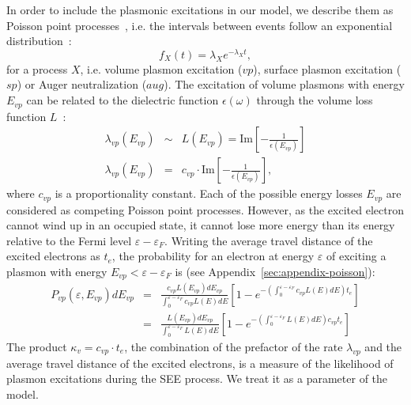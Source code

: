 \begin{refsection}
In order to include the plasmonic excitations in our model, we describe 
them as Poisson point processes~\cite{Egerton2009}, i.e. the intervals between events follow an 
exponential distribution~\cite{MITopencourseware}: 
\begin{equation} 
f_X (t) = \lambda_X e^{-\lambda_X t}, 
\end{equation} 
for a process $X$, i.e. volume plasmon excitation ($vp$), surface plasmon 
excitation ($sp$) or Auger neutralization ($aug$). The 
excitation of volume plasmons with energy $E_{vp}$ can be related to the 
dielectric function $\epsilon (\omega)$ through the volume loss function 
$L$~\cite{Raether1980}: 
\begin{eqnarray} 
\lambda_{vp}(E_{vp}) &\sim& L(E_{vp}) =
\text{Im}\left[-\frac{1}{\epsilon(E_{vp})}\right] \\
\lambda_{vp}(E_{vp}) &=& c_{vp} \cdot \text{Im}\left[-\frac{1}{\epsilon(E_{vp})}\right],
\end{eqnarray} 
where $c_{vp}$ is a proportionality constant.
Each of the possible energy losses $E_{vp}$ are considered as competing Poisson 
point processes. However, as the excited electron cannot wind up in an 
occupied state, it cannot lose more energy than its energy relative to the 
Fermi level $\varepsilon - \varepsilon_F$. Writing the average travel 
distance of the excited electrons as $t_e$, the probability for an electron at 
energy $\varepsilon$ of exciting a plasmon with energy $E_{vp} < \varepsilon - 
\varepsilon_F$ is (see Appendix~\ref{sec:appendix-poisson}): 
\begin{eqnarray} \label{quotas:eq-vp_prob}
P_{vp}(\varepsilon, E_{vp}) dE_{vp} &=& \frac{c_{vp} 
L(E_{vp})dE_{vp}}{\int_0^{\varepsilon - \varepsilon_F} c_{vp} L(E) dE 
}\left[1-e^{-\left(\int_0^{\varepsilon - \varepsilon_F} c_{vp} L(E) dE\right) t_e 
}\right] \\ 
&=& \frac{L(E_{vp})dE_{vp}}{\int_0^{\varepsilon - \varepsilon_F} L(E) dE 
}\left[1-e^{-\left(\int_0^{\varepsilon - \varepsilon_F} L(E) dE\right) c_{vp} t_e 
}\right] 
\end{eqnarray} 
The product $\kappa_v = c_{vp} \cdot t_e$, the combination of the prefactor of the 
rate $\lambda_{vp}$ and the average travel distance of the excited electrons, is a 
measure of the likelihood of plasmon excitations during the SEE process. We 
treat it as a parameter of the model. 
 

\end{refsection}
